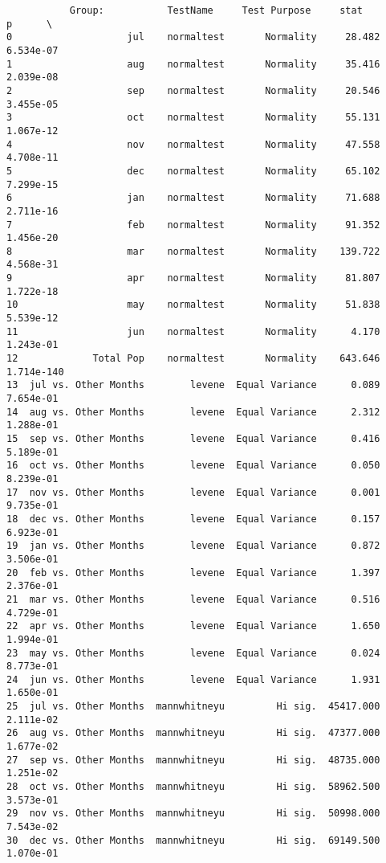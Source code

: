 \documentclass[11pt]{article}
\begin{document}
    
    \begin{verbatim}
           Group:           TestName     Test Purpose     stat          p      \
0                    jul    normaltest       Normality     28.482   6.534e-07   
1                    aug    normaltest       Normality     35.416   2.039e-08   
2                    sep    normaltest       Normality     20.546   3.455e-05   
3                    oct    normaltest       Normality     55.131   1.067e-12   
4                    nov    normaltest       Normality     47.558   4.708e-11   
5                    dec    normaltest       Normality     65.102   7.299e-15   
6                    jan    normaltest       Normality     71.688   2.711e-16   
7                    feb    normaltest       Normality     91.352   1.456e-20   
8                    mar    normaltest       Normality    139.722   4.568e-31   
9                    apr    normaltest       Normality     81.807   1.722e-18   
10                   may    normaltest       Normality     51.838   5.539e-12   
11                   jun    normaltest       Normality      4.170   1.243e-01   
12             Total Pop    normaltest       Normality    643.646  1.714e-140   
13  jul vs. Other Months        levene  Equal Variance      0.089   7.654e-01   
14  aug vs. Other Months        levene  Equal Variance      2.312   1.288e-01   
15  sep vs. Other Months        levene  Equal Variance      0.416   5.189e-01   
16  oct vs. Other Months        levene  Equal Variance      0.050   8.239e-01   
17  nov vs. Other Months        levene  Equal Variance      0.001   9.735e-01   
18  dec vs. Other Months        levene  Equal Variance      0.157   6.923e-01   
19  jan vs. Other Months        levene  Equal Variance      0.872   3.506e-01   
20  feb vs. Other Months        levene  Equal Variance      1.397   2.376e-01   
21  mar vs. Other Months        levene  Equal Variance      0.516   4.729e-01   
22  apr vs. Other Months        levene  Equal Variance      1.650   1.994e-01   
23  may vs. Other Months        levene  Equal Variance      0.024   8.773e-01   
24  jun vs. Other Months        levene  Equal Variance      1.931   1.650e-01   
25  jul vs. Other Months  mannwhitneyu         Hi sig.  45417.000   2.111e-02   
26  aug vs. Other Months  mannwhitneyu         Hi sig.  47377.000   1.677e-02   
27  sep vs. Other Months  mannwhitneyu         Hi sig.  48735.000   1.251e-02   
28  oct vs. Other Months  mannwhitneyu         Hi sig.  58962.500   3.573e-01   
29  nov vs. Other Months  mannwhitneyu         Hi sig.  50998.000   7.543e-02   
30  dec vs. Other Months  mannwhitneyu         Hi sig.  69149.500   1.070e-01   

\end{verbatim}
\end{document}
